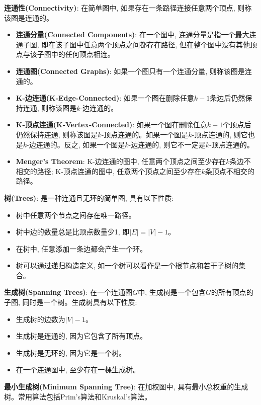 \documentclass[12pt, a4paper, UTF8]{ctexart}
\newcommand{\term}[1]{\textbf{\textcolor{blue!80!black}{#1}}}
\begin{document}
\begin{sloppypar}
    \term{连通性(Connectivity)}: 在简单图中, 如果存在一条路径连接任意两个顶点, 则称该图是连通的。
    \begin{itemize}[nosep]
        \item \term{连通分量(Connected Components)}: 在一个图中, 连通分量是指一个最大连通子图, 即在该子图中任意两个顶点之间都存在路径, 但在整个图中没有其他顶点与该子图中的任何顶点相连。
        \item \term{连通图(Connected Graphs)}: 如果一个图只有一个连通分量, 则称该图是连通的。
        \item \term{K-边连通(K-Edge-Connected)}: 如果一个图在删除任意$k-1$条边后仍然保持连通, 则称该图是$k$-边连通的。
        \item \term{K-顶点连通(K-Vertex-Connected)}: 如果一个图在删除任意$k-1$个顶点后仍然保持连通, 则称该图是$k$-顶点连通的。如果一个图是$k$-顶点连通的, 则它也是$k$-边连通的。反之, 如果一个图是$k$-边连通的, 则它不一定是$k$-顶点连通的。
        \item \term{Menger's Theorem}: K-边连通的图中, 任意两个顶点之间至少存在$k$条边不相交的路径; K-顶点连通的图中, 任意两个顶点之间至少存在$k$条顶点不相交的路径。
    \end{itemize}
    \term{树(Trees)}: 是一种连通且无环的简单图, 具有以下性质:
    \begin{itemize}[nosep]
        \item 树中任意两个节点之间存在唯一路径。
        \item 树中边的数量总是比顶点数量少1, 即$|E| = |V| - 1$。
        \item 在树中, 任意添加一条边都会产生一个环。
        \item 树可以通过递归构造定义, 如一个树可以看作是一个根节点和若干子树的集合。
    \end{itemize}
    \term{生成树(Spanning Trees)}: 在一个连通图$G$中, 生成树是一个包含$G$的所有顶点的子图, 同时是一个树。生成树具有以下性质:
    \begin{itemize}[nosep]
        \item 生成树的边数为$|V| - 1$。
        \item 生成树是连通的, 因为它包含了所有顶点。
        \item 生成树是无环的, 因为它是一个树。
        \item 在一个连通图中, 至少存在一棵生成树。
    \end{itemize}
    \term{最小生成树(Minimum Spanning Tree)}: 在加权图中, 具有最小总权重的生成树。常用算法包括Prim's算法和Kruskal's算法。
    \begin{itemize}[nosep]

\end{itemize}
\end{sloppypar}
\end{document}
